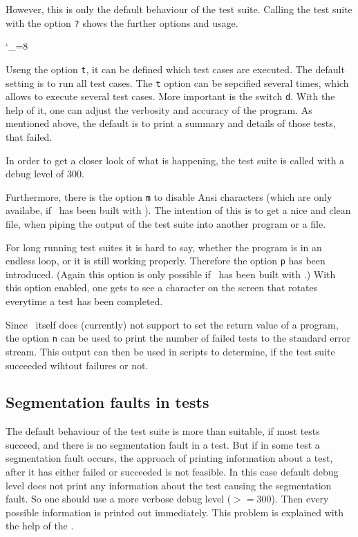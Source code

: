 However, this is only the default behaviour of the test suite. Calling the test suite with the option {\tt?} shows the further options and usage.

\catcode`\_=8

Useng the option {\tt t}, it can be defined which test cases are executed. The default setting is to run all test cases. The {\tt t} option can be sepcified several times, which allows to execute several test cases. More important is the switch \verb|d|. With the help of it, one can adjust the verbosity and accuracy of the program. As mentioned above, the default is to print a summary and details of those tests, that failed. 

In order to get a closer look of what is happening, the test suite is called with a debug level of $300$.


Furthermore, there is the option {\tt m} to disable Ansi characters (which are only availabe, if \projectname~has been built with \LibExtIO). The intention of this is to get a nice and clean file, when piping the output of the test suite into another program or a file.

For long running test suites it is hard to say, whether the program is in an endless loop, or it is still working properly. Therefore the option {\tt p} has been introduced. (Again this option is only possible if \projectname~has been built with \LibExtIO.) With this option enabled, one gets to see a character on the screen that rotates everytime a test has been completed.

Since \Aldor~itself does (currently) not support to set the return value of a program, the option {\tt n} can be used to print the number of failed tests to the standard error stream. This output can then be used in scripts to determine, if the test suite succeeded wihtout failures or not.

\subsection{Segmentation faults in tests}

The default behaviour of the test suite is more than suitable, if most tests succeed, and there is no segmentation fault in a test. But if in some test a segmentation fault occurs, the approach of printing information about a test, after it has either failed or succeeded is not feasible. In this case default debug level does not print any information about the test causing the segmentation fault. So one should use a more verbose debug level ($>=300$). Then every possible information is printed out immediately. This problem is explained with the help of the .


